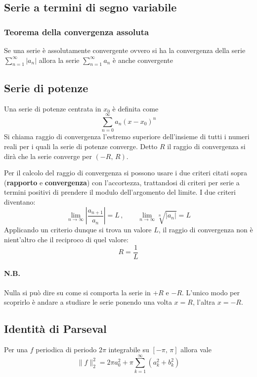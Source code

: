 \documentclass[10pt,a4paper]{report}
\begin{document}
\subsection*{Serie a termini di segno variabile}
                
\subsubsection{Teorema della convergenza assoluta}
Se una serie è assolutamente convergente ovvero si ha la convergenza della serie $ \sum_{n=1}^{\infty} |a_{n}| $ allora la serie $ \sum_{n=1}^{\infty} a_{n} $ è anche convergente

\subsection*{Serie di potenze}
Una serie di potenze centrata in $x_0$ è definita come
\[\sum_{n=0}^\infty a_n (x-x_0)^n\]
Si chiama raggio di convergenza l'estremo superiore dell'insieme di tutti i numeri reali per i quali la serie di potenze converge. Detto $R$ il raggio di convergenza si dirà che la serie converge per $(-R,\,R)$. \medskip

Per il calcolo del raggio di convergenza si possono usare i due criteri citati sopra (\textbf{rapporto} e \textbf{convergenza}) con l'accortezza, trattandosi di criteri per serie a termini positivi di prendere il modulo dell'argomento del limite. I due criteri diventano:
\[
\lim_{n \to \infty} \left\lvert\frac{a_{n+1}}{a_{n}}\right\rvert = L\,,\qquad
\lim_{n \to \infty} \sqrt[n]{\lvert a_{n}\rvert} = L
 \]
Applicando un criterio dunque si trova un valore $L$, il raggio di convergenza non è nient'altro che il reciproco di quel valore:
\[R=\frac{1}{L}\]
\paragraph{N.B.} Nulla si può dire su come si comporta la serie in $+R$ e $-R$. L'unico modo per scoprirlo è andare a studiare le serie ponendo una volta $x=R$, l'altra $x=-R$.

\subsection*{Identità di Parseval}
Per una $f$ periodica di periodo $2\pi$ integrabile su $[-\pi,\,\pi]$ allora vale
\[\lVert f\rVert _2^2 = 2\pi a_0^2 + \pi\sum_{k=1}^\infty (a_k^2+b_k^2)\]
\end{document}
